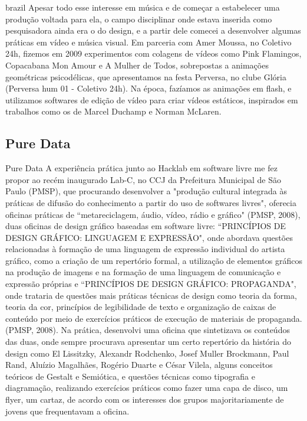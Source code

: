 \begin{otherlanguage*}{brazil}
Apesar todo esse interesse em música e de começar a estabelecer uma produção voltada para ela, o campo disciplinar onde estava inserida como pesquisadora ainda era o do design, e a partir dele comecei a desenvolver algumas práticas em vídeo e música visual. Em parceria com Amer Moussa, no Coletivo 24h, fizemos em 2009 experimentos com colagens de vídeos como Pink Flamingos, Copacabana Mon Amour e A Mulher de Todos, sobrepostas a animações geométricas psicodélicas, que apresentamos na festa Perversa, no clube Glória (Perversa hum 01 - Coletivo 24h). Na época, fazíamos as animações em flash, e utilizamos softwares de edição de vídeo para criar vídeos estáticos, inspirados em trabalhos como os de Marcel Duchamp e Norman McLaren. 

\subsection{Pure Data}

Pure Data
A experiência prática junto ao Hacklab em software livre me fez propor ao recém inaugurado Lab-C, no CCJ da Prefeitura Municipal de São Paulo (PMSP), que procurando desenvolver a "produção cultural integrada às práticas de difusão do conhecimento a partir do uso de softwares livres", oferecia oficinas práticas de ``metareciclagem, áudio, vídeo, rádio e gráfico" (PMSP, 2008), duas oficinas de design gráfico baseadas em software livre: ``PRINCÍPIOS DE DESIGN GRÁFICO: LINGUAGEM E EXPRESSÃO", onde abordava questões relacionadas à formação de uma linguagem de expressão individual do artista gráfico, como a criação de um repertório formal, a utilização de elementos gráficos na produção de imagens e na formação de uma linguagem de comunicação e expressão próprias e ``PRINCÍPIOS DE DESIGN GRÁFICO: PROPAGANDA",  onde trataria de  questões mais práticas técnicas de design como teoria da forma, teoria da cor, princípios de legibilidade de texto e organização de caixas de conteúdo por meio de exercícios práticos de execução de materiais de propaganda. (PMSP, 2008). 
Na prática, desenvolvi uma oficina que sintetizava os conteúdos das duas, onde sempre procurava apresentar um certo repertório da história do design como El Lissitzky, Alexandr Rodchenko, Josef Muller Brockmann, Paul Rand, Aluízio Magalhães, Rogério Duarte e César Vilela, alguns conceitos teóricos de Gestalt e Semiótica, e questões técnicas como tipografia e diagramação, realizando exercícios práticos como fazer uma capa de disco, um flyer, um cartaz, de acordo com os interesses dos grupos majoritariamente de jovens que frequentavam a oficina. 


\end{otherlanguage*}

